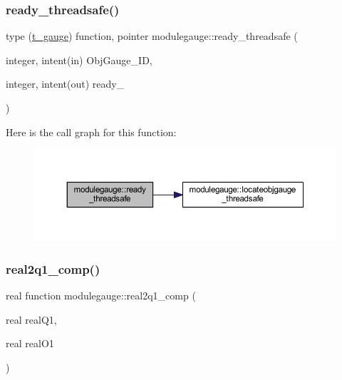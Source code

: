 \subsubsection{\texorpdfstring{ready\+\_\+threadsafe()}{ready\_threadsafe()}}
{\footnotesize\ttfamily type (\mbox{\hyperlink{structmodulegauge_1_1t__gauge}{t\+\_\+gauge}}) function, pointer modulegauge\+::ready\+\_\+threadsafe (\begin{DoxyParamCaption}\item[{integer, intent(in)}]{Obj\+Gauge\+\_\+\+ID,  }\item[{integer, intent(out)}]{ready\+\_\+ }\end{DoxyParamCaption})\hspace{0.3cm}{\ttfamily [private]}}

Here is the call graph for this function\+:\nopagebreak
\begin{figure}[H]
\begin{center}
\leavevmode
\includegraphics[width=350pt]{namespacemodulegauge_a758cb1de5348d750b81f0adbb711363f_cgraph}
\end{center}
\end{figure}
\mbox{\label{namespacemodulegauge_a3570d6ed4834d7d873f7b068c99c9ef5}} 
\subsubsection{\texorpdfstring{real2q1\+\_\+comp()}{real2q1\_comp()}}
{\footnotesize\ttfamily real function modulegauge\+::real2q1\+\_\+comp (\begin{DoxyParamCaption}\item[{real}]{real\+Q1,  }\item[{real}]{real\+O1 }\end{DoxyParamCaption})\hspace{0.3cm}{\ttfamily [private]}}

